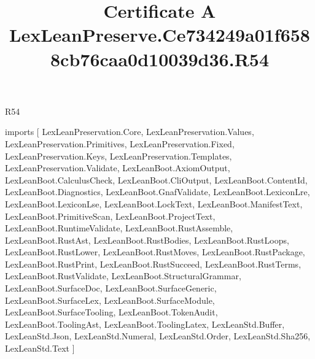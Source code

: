 \begin{lexlean}{R54}
\title{Certificate A LexLeanPreserve.Ce734249a01f6588cb76caa0d10039d36.R54}
\begin{coremodule}
imports [
  LexLeanPreservation.Core,
  LexLeanPreservation.Values,
  LexLeanPreservation.Primitives,
  LexLeanPreservation.Fixed,
  LexLeanPreservation.Keys,
  LexLeanPreservation.Templates,
  LexLeanPreservation.Validate,
  LexLeanBoot.AxiomOutput,
  LexLeanBoot.CalculusCheck,
  LexLeanBoot.CliOutput,
  LexLeanBoot.ContentId,
  LexLeanBoot.Diagnostics,
  LexLeanBoot.GnafValidate,
  LexLeanBoot.LexiconLre,
  LexLeanBoot.LexiconLse,
  LexLeanBoot.LockText,
  LexLeanBoot.ManifestText,
  LexLeanBoot.PrimitiveScan,
  LexLeanBoot.ProjectText,
  LexLeanBoot.RuntimeValidate,
  LexLeanBoot.RustAssemble,
  LexLeanBoot.RustAst,
  LexLeanBoot.RustBodies,
  LexLeanBoot.RustLoops,
  LexLeanBoot.RustLower,
  LexLeanBoot.RustMoves,
  LexLeanBoot.RustPackage,
  LexLeanBoot.RustPrint,
  LexLeanBoot.RustSucceed,
  LexLeanBoot.RustTerms,
  LexLeanBoot.RustValidate,
  LexLeanBoot.StructuralGrammar,
  LexLeanBoot.SurfaceDoc,
  LexLeanBoot.SurfaceGeneric,
  LexLeanBoot.SurfaceLex,
  LexLeanBoot.SurfaceModule,
  LexLeanBoot.SurfaceTooling,
  LexLeanBoot.TokenAudit,
  LexLeanBoot.ToolingAst,
  LexLeanBoot.ToolingLatex,
  LexLeanStd.Buffer,
  LexLeanStd.Json,
  LexLeanStd.Numeral,
  LexLeanStd.Order,
  LexLeanStd.Sha256,
  LexLeanStd.Text
]


\end{coremodule}
\end{lexlean}
